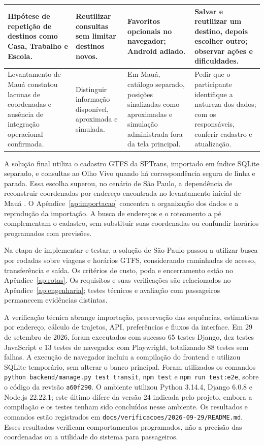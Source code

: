 \documentclass[12pt,oneside,a4paper,brazil,chapter=TITLE]{abntex2}
\begin{document}
\begin{longtable}{>{\raggedright\arraybackslash}p{}>{\raggedright\arraybackslash}p{}>{\raggedright\arraybackslash}p{}>{\raggedright\arraybackslash}p{}}
\hline
Hipótese de repetição de destinos como Casa, Trabalho e Escola.
& Reutilizar consultas sem limitar destinos novos.
& Favoritos opcionais no navegador; Android adiado.
& Salvar e reutilizar um destino, depois escolher outro; observar ações e dificuldades.\\
\hline
Levantamento de Mauá constatou lacunas de coordenadas e ausência de integração operacional confirmada.
& Distinguir informação disponível, aproximada e simulada.
& Em Mauá, catálogo separado, posições sinalizadas como aproximadas e simulação administrada fora da tela principal.
& Pedir que o participante identifique a natureza dos dados; com os responsáveis, conferir cadastro e atualização.\\
\end{longtable}
\endgroup

\label{sec:conversao}
A solução final utiliza o cadastro GTFS da SPTrans, importado em índice SQLite separado, e consultas ao Olho Vivo quando há correspondência segura de linha e parada. Essa escolha superou, no cenário de São Paulo, a dependência de reconstruir coordenadas por endereço encontrada no levantamento inicial de Mauá \citep{mbmimportacoes}. O Apêndice~\ref{ap:importacao} concentra a organização dos dados e a reprodução da importação. A busca de endereços e o roteamento a pé complementam o cadastro, sem substituir suas coordenadas ou confundir horários programados com previsões.

\label{sec:implementar-testar}
Na etapa de implementar e testar, a solução de São Paulo passou a utilizar busca por rodadas sobre viagens e horários GTFS, considerando caminhadas de acesso, transferência e saída. Os critérios de custo, poda e encerramento estão no Apêndice~\ref{ap:rotas}. Os requisitos e suas verificações são relacionados no Apêndice~\ref{ap:engenharia}; testes técnicos e avaliação com passageiros permanecem evidências distintas.

A verificação técnica abrange importação, preservação das sequências, estimativas por endereço, cálculo de trajetos, API, preferências e fluxos da interface. Em 29 de setembro de 2026, foram executados com sucesso 65 testes Django, dez testes JavaScript e 13 testes de navegador com Playwright, totalizando 88 testes sem falhas. A execução de navegador incluiu a compilação do frontend e utilizou SQLite temporário, sem alterar o banco principal. Foram utilizados os comandos \texttt{python backend/manage.py test transit}, \texttt{npm test} e \texttt{npm run test:e2e}, sobre o código da revisão \texttt{a60f290}. O ambiente utilizou Python 3.14.4, Django 6.0.8 e Node.js 22.22.1; este último difere da versão 24 indicada pelo projeto, embora a compilação e os testes tenham sido concluídos nesse ambiente. Os resultados e comandos estão registrados em \nolinkurl{docs/verificacoes/2026-09-29/README.md}. Esses resultados verificam comportamentos programados, não a precisão das coordenadas ou a utilidade do sistema para passageiros.
\end{document}
